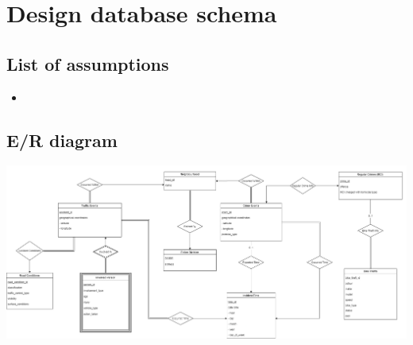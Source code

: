 \documentclass[12pt, a4paper]{article}
\begin{document}
\section*{Design database schema}
\subsection*{List of assumptions}
\begin{itemize}
    \item
\end{itemize}
\subsection*{E/R diagram}
\includegraphics[scale=0.25]{ER Diagram.png}
\end{document}
